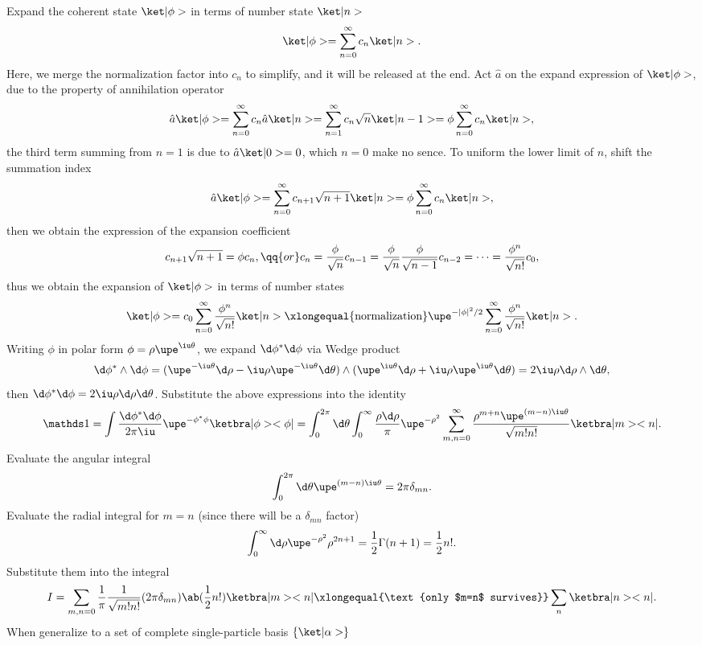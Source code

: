 \begin{solution}
  Expand the coherent state $\ket|\phi>$ in terms of number state $\ket|n>$
  \[
    \ket|\phi> = \sum_{n=0}^\infty c_n \ket|n>.
  \]
  Here, we merge the normalization factor into $c_n$ to simplify, and it will be released at the end. Act $\hat a$ on the expand expression of $\ket|\phi>$, due to the property of annihilation operator
  \[
    \hat a \ket|\phi> = \sum_{n=0}^\infty c_n \hat a \ket|n>
  = \sum_{n=1}^\infty c_n \sqrt n \ket|n - 1>
  = \phi \sum_{n=0}^\infty c_n \ket|n>,
  \]
  the third term summing from $n = 1$ is due to $\hat a\ket|0> = 0$,
  which $n = 0$ make no sence. To uniform the lower limit of $n$,
  shift the summation index
  \[
    \hat a \ket|\phi>
  = \sum_{n=0}^\infty c_{n+1} \sqrt{n + 1} \ket|n>
  = \phi \sum_{n=0}^\infty c_n \ket|n>,
  \]
  then we obtain the expression of the expansion coefficient
  \[
    c_{n+1} \sqrt{n + 1} = \phi c_n, \qq{or}
    c_n = \frac\phi{\sqrt n} c_{n-1}
  = \frac\phi{\sqrt n} \frac\phi{\sqrt{n - 1}} c_{n-2} = \cdots
  = \frac{\phi^n}{\sqrt{n!}} c_0,
  \]
  thus we obtain the expansion of $\ket|\phi>$ in terms of number states
  \[
    \ket|\phi> = c_0 \sum_{n=0}^\infty \frac{\phi^n}{\sqrt{n!}} \ket|n>
  \xlongequal{\text{normalization}}
    \upe^{-|\phi|^2/2} \sum_{n=0}^\infty \frac{\phi^n}{\sqrt{n!}} \ket|n>.
  \]
  Writing $\phi$ in polar form $\phi = \rho \upe^{\iu\theta}$,
  we expand $\d\phi^* \d\phi$ via Wedge product
  \[
    \d\phi^* \wedge \d\phi
  = (\upe^{-\iu\theta} \d\rho - \iu\rho\upe^{-\iu\theta} \d\theta) \wedge
    (\upe^{\iu\theta} \d\rho + \iu\rho\upe^{\iu\theta} \d\theta)
  = 2\iu\rho\d\rho \wedge \d\theta,
  \]
  then $\d\phi^* \d\phi = 2\iu\rho\d\rho\d\theta$.
  Substitute the above expressions into the identity
  \[
  \identity = \int \frac{\d\phi^* \d\phi}{2\pi\iu} \upe^{-\phi^*\phi} \ketbra|\phi><\phi|
  = \int_0^{2\pi} \d\theta \int_0^\infty
    \frac{\rho\d\rho}{\pi} \upe^{-\rho^2} \sum_{m,n=0}^\infty
    \frac{\rho^{m+n} \upe^{(m-n)\iu\theta}}{\sqrt{m!n!}}
    \ketbra|m><n|.
  \]
  Evaluate the angular integral
  \[
    \int_0^{2\pi} \d\theta \upe^{(m-n)\iu\theta} = 2\pi \delta_{mn}.
  \]
  Evaluate the radial integral for $m = n$ (since there will be a $\delta_{mn}$ factor)
  \[
    \int_0^\infty \d\rho \upe^{-\rho^2} \rho^{2n+1}
  = \frac12\Gamma(n + 1) = \frac12n!.
  \]
  Substitute them into the integral
  \[
    I = \sum_{m,n=0} \frac1\pi \frac1{\sqrt{m!n!}}
        (2\pi\delta_{mn}) \ab(\frac12 n!) \ketbra|m><n|
      \xlongequal{\text{only $m=n$ survives}} \sum_n \ketbra|n><n|.
  \]
  When generalize to a set of complete single-particle basis $\{\ket|\alpha>\}$

\end{solution}
